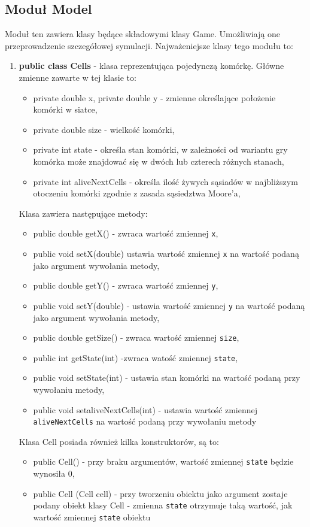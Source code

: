 \documentclass[10pt, oneside]{article}
\begin{document}
\subsection {Moduł Model}
Moduł ten zawiera klasy będące składowymi klasy Game. Umożliwiają one przeprowadzenie szczegółowej symulacji. Najważeniejsze klasy tego modułu to:
\begin {enumerate}
\item  \textbf{ public class Cells} - klasa reprezentująca pojedynczą komórkę. Główne zmienne zawarte w tej klasie to:
	\begin{itemize}
		\item private double x, private double y - zmienne określające położenie komórki w siatce,
		\item private double size -  wielkość komórki,
		\item private int state -  określa stan komórki, w zależności od wariantu gry komórka może znajdować się w dwóch lub czterech różnych stanach,
		\item private int aliveNextCells - określa ilość żywych sąsiadów w najbliższym otoczeniu komórki zgodnie z zasada sąsiedztwa Moore'a,
	\end{itemize}
	
	Klasa zawiera następujące metody:
	\begin{itemize}
	\item public double getX() - zwraca wartość zmiennej \texttt{x},
	\item public void setX(double)  ustawia wartość zmiennej \texttt {x} na wartość podaną jako argument wywołania metody,
	\item public double getY() - zwraca wartość zmiennej \texttt{y},
	\item  public void setY(double) - ustawia wartość zmiennej \texttt{y}  na wartość podaną jako argument wywołania metody,
	\item  public double getSize() - zwraca wartość zmiennej \texttt{size},
	\item public int getState(int) -zwraca watość zmiennej \texttt{state},
	\item public void setState(int) - ustawia stan komórki na wartość podaną przy wywołaniu metody,
	\item public void setaliveNextCells(int) - ustawia wartość zmiennej \texttt {aliveNextCells} na wartość podaną przy wywołaniu metody
	\end{itemize}

	Klasa Cell posiada również kilka konstruktorów, są to:
	\begin{itemize}
	\item public Cell() - przy braku argumentów, wartość zmiennej \texttt{state} będzie wynosiła 0,
	\item public Cell (Cell cell) - przy tworzeniu obiektu jako argument zostaje podany obiekt klasy Cell - zmienna \texttt{state} otrzymuje taką wartość, jak wartość zmiennej \texttt {state} obiektu 
	\end{itemize}



\end{enumerate}
\end{document}

